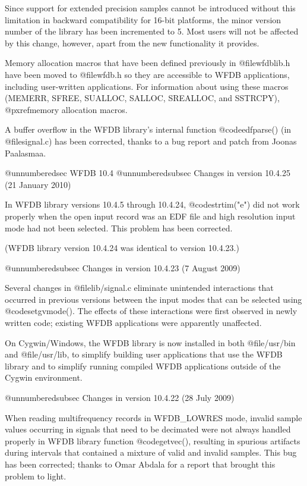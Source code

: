 {{{{{{{{Since support for extended precision samples cannot be introduced
without this limitation in backward compatibility for 16-bit
platforms, the minor version number of the library has been
incremented to 5.  Most users will not be affected by this change,
however, apart from the new functionality it provides.

Memory allocation macros that have been defined previously in
@file{wfdblib.h} have been moved to @file{wfdb.h} so they are
accessible to WFDB applications, including user-written applications.
For information about using these macros (MEMERR, SFREE, SUALLOC,
SALLOC, SREALLOC, and SSTRCPY), @pxref{memory allocation macros}.

A buffer overflow in the WFDB library's internal function @code{edfparse()}
(in @file{signal.c}) has been corrected, thanks to a bug report and patch
from Joonas Paalasmaa.

@unnumberedsec WFDB 10.4
@unnumberedsubsec Changes in version 10.4.25 (21 January 2010)

In WFDB library versions 10.4.5 through 10.4.24, @code{strtim("e")} did not
work properly when the open input record was an EDF file and high
resolution input mode had not been selected.  This problem has been
corrected.

(WFDB library version 10.4.24 was identical to version 10.4.23.)

@unnumberedsubsec Changes in version 10.4.23 (7 August 2009)

Several changes in @file{lib/signal.c} eliminate unintended interactions that
occurred in previous versions between the input modes that can be
selected using @code{setgvmode()}.  The effects of these interactions were
first observed in newly written code; existing WFDB applications were
apparently unaffected.

On Cygwin/Windows, the WFDB library is now installed in both @file{/usr/bin}
and @file{/usr/lib}, to simplify building user applications that use the WFDB
library and to simplify running compiled WFDB applications outside of
the Cygwin environment.
	
@unnumberedsubsec Changes in version 10.4.22 (28 July 2009)

When reading multifrequency records in WFDB_LOWRES mode, invalid
sample values occurring in signals that need to be decimated were not
always handled properly in WFDB library function @code{getvec()}, resulting
in spurious artifacts during intervals that contained a mixture of
valid and invalid samples.  This bug has been corrected; thanks to
Omar Abdala for a report that brought this problem to light.

}}}}}}}}
